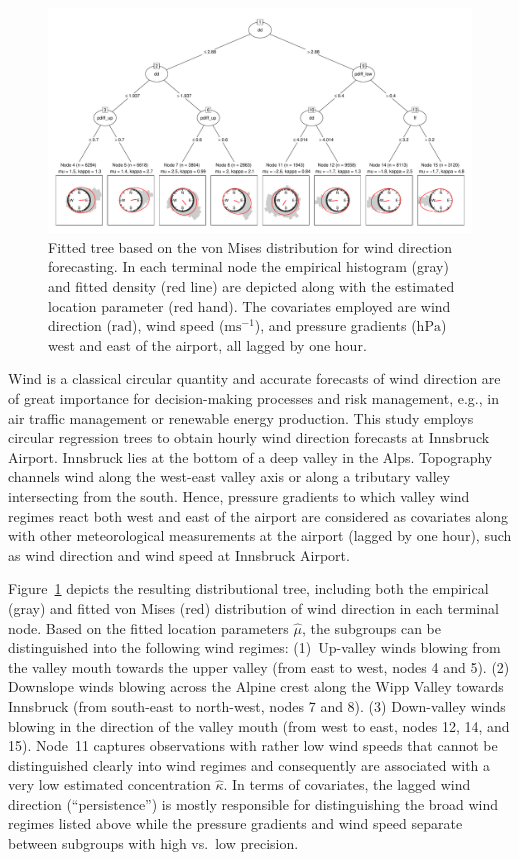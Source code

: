 \documentclass[twoside]{report}
\begin{document}
\begin{figure}[p!]\centering
\includegraphics[height = .5\textheight,angle=90,origin=c]{schlosser-circtree_plot.pdf}
\caption{Fitted tree based on the von Mises distribution for wind direction forecasting.
In each terminal node the empirical histogram (gray) and fitted density (red line)
are depicted along with the estimated location parameter (red hand). The covariates
employed are wind direction ($\text{rad}$), wind speed ($\text{ms}^{-1}$),
and pressure gradients ($\text{hPa}$) west and east of the airport,
all lagged by one hour.}
\label{schlosser:fig_tree} \end{figure}

Wind is a classical circular quantity and accurate forecasts of wind direction
are of great importance for decision-making processes and risk management,
e.g., in air traffic management or renewable energy production. This study
employs circular regression trees to obtain hourly wind direction
forecasts at Innsbruck Airport.
Innsbruck lies at the bottom of a deep valley in the Alps. Topography
channels wind along the west-east valley axis or along a tributary valley
intersecting from the south. Hence, pressure gradients to which valley wind
regimes react both west and east of the airport are considered as covariates
along with other meteorological measurements at the airport (lagged by one hour),
such as wind direction and wind speed at Innsbruck Airport.

Figure~\ref{schlosser:fig_tree} depicts the resulting distributional tree, including
both the empirical (gray) and fitted von Mises (red) distribution of wind direction
in each terminal node. Based on the fitted location parameters $\hat \mu$, the subgroups
can be distinguished into the following wind regimes:
(1)~Up-valley winds blowing from the valley mouth towards the upper valley
(from east to west, nodes 4 and 5). (2) Downslope winds blowing across
the Alpine crest along the Wipp Valley towards Innsbruck (from south-east to
north-west, nodes 7 and 8). (3) Down-valley winds blowing in the direction
of the valley mouth (from west to east, nodes 12, 14, and 15). Node~11
captures observations with rather low wind speeds that cannot be distinguished
clearly into wind regimes and consequently are associated with a very low
estimated concentration $\hat \kappa$. In terms of covariates, the lagged
wind direction (``persistence'') is mostly responsible for distinguishing
the broad wind regimes listed above while the pressure gradients and wind
speed separate between subgroups with high vs.\ low precision.
\end{document}
